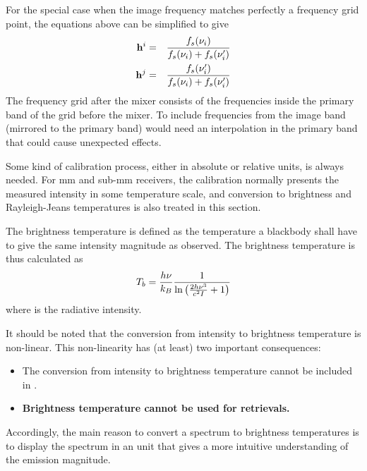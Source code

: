  For the special case when the image frequency matches perfectly a frequency
 grid point, the equations above can be simplified to give
 \begin{eqnarray}
    \mathbf{h}^i &=& \frac{f_s(\nu_i)}{f_s(\nu_i)+f_s(\nu_i')}    \nonumber \\
    \mathbf{h}^j &=& \frac{f_s(\nu_i')}{f_s(\nu_i)+f_s(\nu_i')}    \nonumber
 \end{eqnarray}
 The frequency grid after the mixer consists of the frequencies inside
 the primary band of the grid before the mixer. To include frequencies
 from the image band (mirrored to the primary band) would need an 
 interpolation in the primary band that could cause unexpected effects.  
 
 
 \label{sec:sensor:cal}

 Some kind of calibration process, either in absolute or relative units,
 is always needed. For mm and sub-mm receivers, the calibration normally
 presents the measured intensity in some temperature scale, and conversion
 to brightness and Rayleigh-Jeans temperatures is also treated in this section.


 \label{sec:sensor:cal:tb}

 The brightness temperature is defined as the temperature a blackbody 
 shall have to give the same intensity magnitude as observed. The 
 brightness temperature is thus calculated as
 \begin{equation}
   T_b = \frac{h\nu}{k_B} \frac{1}{\ln{ \left( \frac{2h\ensuremath{\nu}^3}{c^2\ensuremath{I}}+1 \right)}}
   \label{eq:sensor:cal:tb}
 \end{equation}
 where \mpbi is the radiative intensity.
 
 It should be noted that the conversion from intensity to brightness
 temperature is non-linear. This non-linearity has (at least) two important
 consequences:
 \begin{itemize}
  \item The conversion from intensity to brightness temperature cannot be
        included in \Hm.
  \item \bf{Brightness temperature cannot be used for retrievals.}
 \end{itemize}
 Accordingly, the main reason to convert a spectrum to brightness
 temperatures is to display the spectrum in an unit that gives a more
 intuitive understanding of the emission magnitude.


 \label{sec:sensor:cal:rj}

